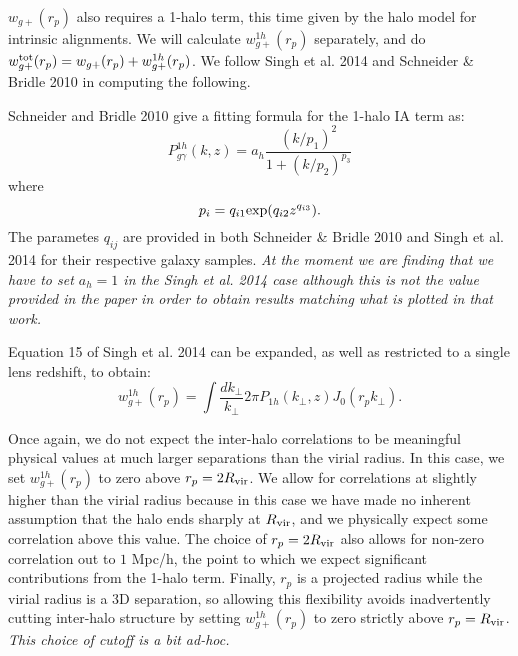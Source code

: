 \documentclass[onecolumn,amsmath,aps,fleqn, superscriptaddress]{revtex4}
\begin{document}
$w_{g+}(r_p)$ also requires a 1-halo term, this time given by the halo model for intrinsic alignments. We will calculate $w_{g+}^{1h}(r_p)$ separately, and do $w_{g+}^{\rm tot}(r_p) = w_{g+}(r_p) + w_{g+}^{1h}(r_p)$. We follow Singh et al. 2014 and Schneider \& Bridle 2010 in computing the following.

Schneider and Bridle 2010 give a fitting formula for the 1-halo IA term as:
\begin{equation}
P^{1h}_{g\gamma}(k,z) = a_h \frac{(k/p_1)^2}{1+ (k/p_2)^{p_3}}
\label{P1hIA}
\end{equation}
where
\begin{equation}
p_i = q_{i1} {\rm exp}(q_{i2} z^{q_{i3}}).
\label{pi}
\end{equation}
The parametes $q_{ij}$ are provided in both Schneider \& Bridle 2010 and Singh et al. 2014 for their respective galaxy samples. {\it At the moment we are finding that we have to set $a_h=1$ in the Singh et al. 2014 case although this is not the value provided in the paper in order to obtain results matching what is plotted in that work.}

Equation 15 of Singh et al. 2014 can be expanded, as well as restricted to a single lens redshift, to obtain:
\begin{equation}
w_{g+}^{1h}(r_p) = \int \frac{dk_\perp}{k_\perp}{2\pi} P_{1h}(k_\perp,z) J_0(r_p k_\perp).
\label{wg1h}
\end{equation}

Once again, we do not expect the inter-halo correlations to be meaningful physical values at much larger separations than the virial radius. In this case, we set $w_{g+}^{1h}(r_p)$ to zero above $r_p = 2 R_{\rm vir}$. We allow for correlations at slightly higher than the virial radius because in this case we have made no inherent assumption that the halo ends sharply at $R_{\rm vir}$, and we physically expect some correlation above this value. The choice of $r_p = 2 R_{\rm vir}$ also allows for non-zero correlation out to $1$ Mpc/h, the point to which we expect significant contributions from the 1-halo term. Finally, $r_p$ is a projected radius while the virial radius is a 3D separation, so allowing this flexibility avoids inadvertently cutting inter-halo structure by setting $w_{g+}^{1h}(r_p)$ to zero strictly above $r_p = R_{\rm vir}$. {\it This choice of cutoff is a bit ad-hoc.}
\end{document}
